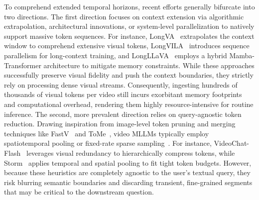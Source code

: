 To comprehend extended temporal horizons, recent efforts generally bifurcate into two directions. The first direction focuses on context extension via algorithmic extrapolation, architectural innovations, or system-level parallelization to natively support massive token sequences.
%
For instance, LongVA~\cite{zhang2024long} extrapolates the context window to comprehend extensive visual tokens, LongVILA~\cite{chen2024longvila} introduces sequence parallelism for long-context training, and LongLLaVA~\cite{wang2024longllava} employs a hybrid Mamba-Transformer architecture to mitigate memory constraints.
%
While these approaches successfully preserve visual fidelity and push the context boundaries, they strictly rely on processing dense visual streams. Consequently, ingesting hundreds of thousands of visual tokens per video still incurs exorbitant memory footprints and computational overhead, rendering them highly resource-intensive for routine inference.
%
The second, more prevalent direction relies on query-agnostic token reduction. Drawing inspiration from image-level token pruning and merging techniques like FastV~\cite{chen2024image} and ToMe~\cite{bolya2022token}, video MLLMs typically employ spatiotemporal pooling or fixed-rate sparse sampling~\cite{maaz2024video,li2025videochat,jin2024chat,li2024videochat,jiang2025storm}.
%
For instance, VideoChat-Flash~\cite{li2024videochat} leverages visual redundancy to hierarchically compress tokens, while Storm~\cite{jiang2025storm} applies temporal and spatial pooling to fit tight token budgets.
%
However, because these heuristics are completely agnostic to the user's textual query, they risk blurring semantic boundaries and discarding transient, fine-grained segments that may be critical to the downstream question.


